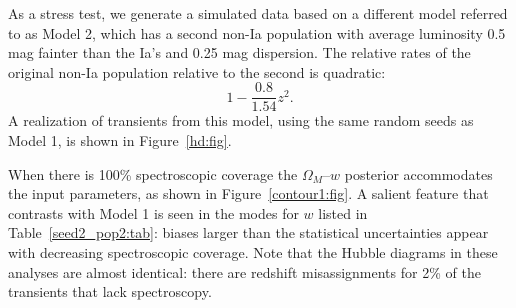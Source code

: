 \documentclass[preprint]{aastex}
\begin{document}
As a stress test, we generate a simulated data based on a different model
referred to as Model 2, which
has a second non-Ia population with average luminosity 0.5 mag fainter
than the Ia's and 0.25 mag dispersion.
The relative rates of the original non-Ia population relative to the second is quadratic:
\begin{equation}
1 -\frac{0.8}{1.54}z^2.
\end{equation}
A realization of transients from this model, using the same random seeds
as Model 1, is shown in Figure~\ref{hd:fig}.

When there is 100\% spectroscopic coverage the   $\Omega_M$--$w$  posterior accommodates the input 
parameters, as shown  in
Figure~\ref{contour1:fig}.
A salient feature that contrasts with Model 1 is 
seen in the modes for $w$ listed in Table~\ref{seed2_pop2:tab}: biases
larger than the statistical uncertainties appear with decreasing
spectroscopic coverage.  Note that the Hubble diagrams
in these analyses are almost identical: there are redshift misassignments
for 2\% of the transients that lack spectroscopy. 


%
\end{document}
